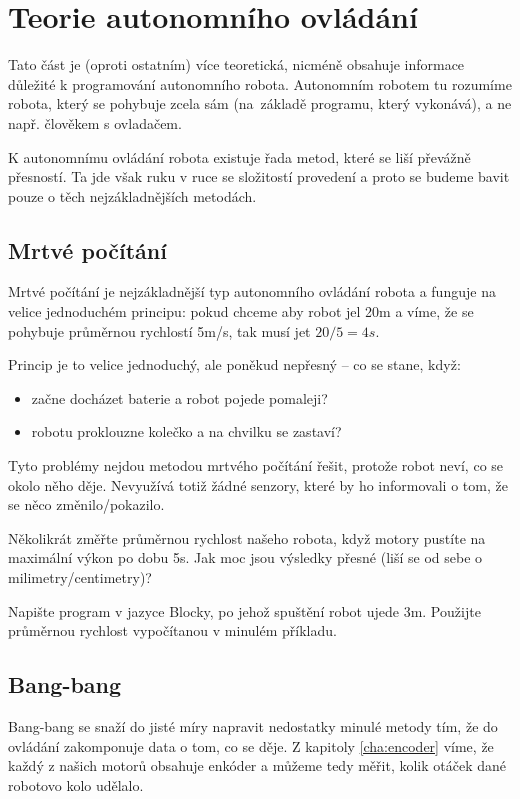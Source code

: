 \documentclass[../main.tex]{subfiles}
\begin{document}
	\section{Teorie autonomního ovládání}

	Tato část je (oproti ostatním) více teoretická, nicméně obsahuje informace důležité k programování autonomního robota. Autonomním robotem tu rozumíme robota, který se pohybuje zcela sám (\mbox{na~základě} programu, který vykonává), a ne např. člověkem s ovladačem.

	K autonomnímu ovládání robota existuje řada metod, které se liší převážně přesností. Ta jde však  ruku v ruce se složitostí provedení a proto se budeme bavit pouze o těch nejzákladnějších metodách.

	\subsection{Mrtvé počítání}
	Mrtvé počítání je nejzákladnější typ autonomního ovládání robota a funguje na velice jednoduchém principu: pokud chceme aby robot jel \si{20m} a víme, že se pohybuje průměrnou rychlostí \si{5m/s}, tak musí jet $20 / 5 = \si{4s}$.

	Princip je to velice jednoduchý, ale poněkud nepřesný -- co se stane, když:
	\begin{itemize}
		\item začne docházet baterie a robot pojede pomaleji?
		\item robotu proklouzne kolečko a na chvilku se zastaví?
	\end{itemize}

	Tyto problémy nejdou metodou mrtvého počítání řešit, protože robot neví, co se okolo něho děje. Nevyužívá totiž žádné senzory, které by ho informovali o tom, že se něco změnilo/pokazilo.

	\begin{question}
		Několikrát změřte průměrnou rychlost našeho robota, když motory pustíte na maximální výkon po dobu \si{5s}. Jak moc jsou výsledky přesné (liší se od sebe o milimetry/centimetry)?
	\end{question}

	\begin{question}
		Napište program v jazyce Blocky, po jehož spuštění robot ujede \si{3m}. Použijte průměrnou rychlost vypočítanou v minulém příkladu.
	\end{question}

	\subsection{Bang-bang}
	Bang-bang se snaží do jisté míry napravit nedostatky minulé metody tím, že do ovládání zakomponuje data o tom, co se děje. Z kapitoly \ref{cha:encoder} víme, že každý z našich motorů obsahuje enkóder a můžeme tedy měřit, kolik otáček dané robotovo kolo udělalo.
\end{document}

